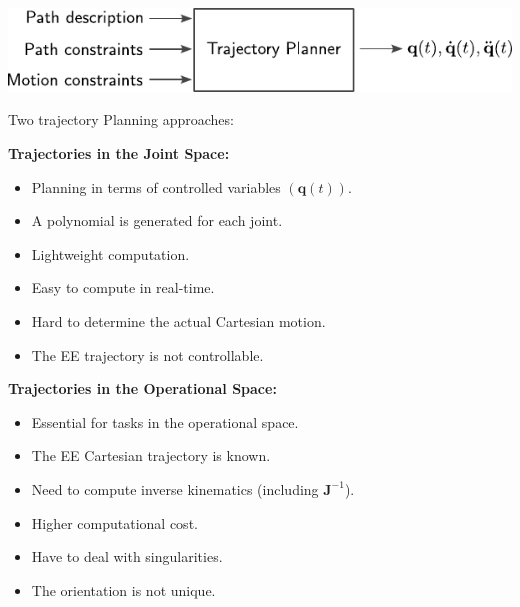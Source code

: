 \documentclass[10pt, aspectratio=169]{beamer}
\theoremstyle{remark}
\theoremstyle{definition}
\begin{document}
\begin{frame}[allowframebreaks]
\begin{itemize}
        \vspace{0.5cm}
        \centering
        \includegraphics{images/trajectory_planner_schema.pdf}
    \end{itemize}

    \framebreak
    Two trajectory Planning approaches:
    
    \begin{center}
    \begin{minipage}[t]{.5\linewidth}
        \textbf{\textcolor{uma_blue_dark}{Trajectories in the Joint Space:}}
        \begin{itemize}
            \item Planning in terms of controlled variables $(\mathbf{q}(t))$.
            \item A polynomial is generated for each joint.
            \item Lightweight computation.
            \item Easy to compute in real-time.
            \item Hard to determine the actual Cartesian motion.
            \item The EE trajectory is not controllable.
        \end{itemize}
    \end{minipage}
    \begin{minipage}[t]{.49\linewidth}
        \textbf{\textcolor{uma_blue_dark}{Trajectories in the Operational Space:}}
        \begin{itemize}
            \item Essential for tasks in the operational space.
            \item The EE Cartesian trajectory is known.
            \item Need to compute inverse kinematics (including $\mathbf{J}^{-1}$).
            \item Higher computational cost.
            \item Have to deal with singularities.
            \item The orientation is not unique.
            
        \end{itemize}
    \end{minipage}
    \end{center}

  
\end{frame}
\end{document}
